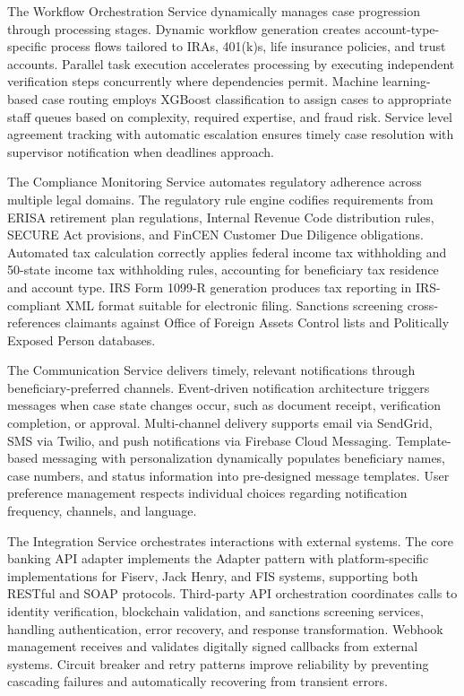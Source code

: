 The Workflow Orchestration Service dynamically manages case progression through processing stages. Dynamic workflow generation creates account-type-specific process flows tailored to IRAs, 401(k)s, life insurance policies, and trust accounts. Parallel task execution accelerates processing by executing independent verification steps concurrently where dependencies permit. Machine learning-based case routing employs XGBoost classification to assign cases to appropriate staff queues based on complexity, required expertise, and fraud risk. Service level agreement tracking with automatic escalation ensures timely case resolution with supervisor notification when deadlines approach.

The Compliance Monitoring Service automates regulatory adherence across multiple legal domains. The regulatory rule engine codifies requirements from ERISA retirement plan regulations, Internal Revenue Code distribution rules, SECURE Act provisions, and FinCEN Customer Due Diligence obligations. Automated tax calculation correctly applies federal income tax withholding and 50-state income tax withholding rules, accounting for beneficiary tax residence and account type. IRS Form 1099-R generation produces tax reporting in IRS-compliant XML format suitable for electronic filing. Sanctions screening cross-references claimants against Office of Foreign Assets Control lists and Politically Exposed Person databases.

The Communication Service delivers timely, relevant notifications through beneficiary-preferred channels. Event-driven notification architecture triggers messages when case state changes occur, such as document receipt, verification completion, or approval. Multi-channel delivery supports email via SendGrid, SMS via Twilio, and push notifications via Firebase Cloud Messaging. Template-based messaging with personalization dynamically populates beneficiary names, case numbers, and status information into pre-designed message templates. User preference management respects individual choices regarding notification frequency, channels, and language.

The Integration Service orchestrates interactions with external systems. The core banking API adapter implements the Adapter pattern with platform-specific implementations for Fiserv, Jack Henry, and FIS systems, supporting both RESTful and SOAP protocols. Third-party API orchestration coordinates calls to identity verification, blockchain validation, and sanctions screening services, handling authentication, error recovery, and response transformation. Webhook management receives and validates digitally signed callbacks from external systems. Circuit breaker and retry patterns improve reliability by preventing cascading failures and automatically recovering from transient errors.

